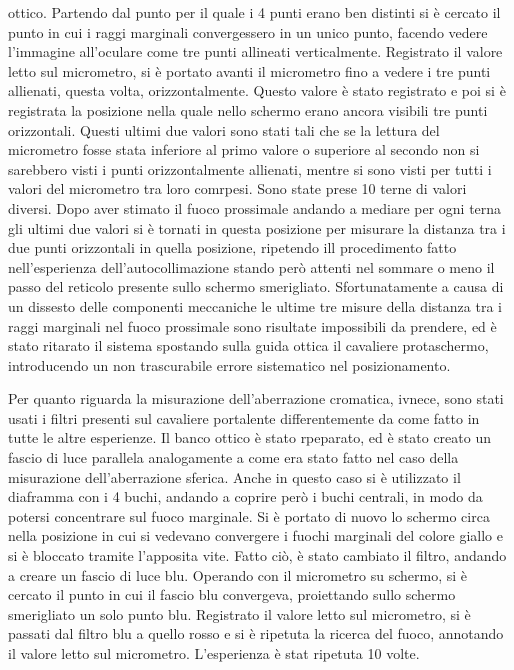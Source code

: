  ottico. Partendo dal punto per il quale i 4 punti erano ben distinti si è cercato il punto in cui i raggi marginali convergessero
 in un unico punto, facendo vedere l'immagine all'oculare come tre punti allineati verticalmente. Registrato il valore letto sul
 micrometro, si è portato avanti il micrometro fino a vedere i tre punti allienati, questa volta, orizzontalmente. Questo valore
 è stato registrato e poi si è registrata la posizione nella quale nello schermo erano ancora visibili tre punti orizzontali.
 Questi ultimi due valori sono stati tali che se la lettura del micrometro fosse stata inferiore al primo valore o superiore
 al secondo non si sarebbero visti i punti orizzontalmente allienati, mentre si sono visti per tutti i valori del micrometro tra
 loro comrpesi. Sono state prese 10 terne di valori diversi. Dopo aver stimato il fuoco prossimale andando a mediare per ogni terna
 gli ultimi due valori si è tornati in questa posizione per misurare la distanza tra i due punti orizzontali in quella posizione,
 ripetendo ill procedimento fatto nell'esperienza dell'autocollimazione stando però attenti nel sommare o meno il passo del reticolo
 presente sullo schermo smerigliato. Sfortunatamente a causa di un dissesto delle componenti meccaniche le ultime tre misure della
 distanza tra i raggi marginali nel fuoco prossimale sono risultate impossibili da prendere, ed è stato ritarato il sistema spostando
 sulla guida ottica il cavaliere protaschermo, introducendo un non trascurabile errore sistematico nel posizionamento.

 Per quanto riguarda la misurazione dell'aberrazione cromatica, ivnece, sono stati usati i filtri presenti sul cavaliere portalente
 differentemente da come fatto in tutte le altre esperienze. Il banco ottico è stato rpeparato, ed è stato creato un fascio di luce
 parallela analogamente a come era stato fatto nel caso della misurazione dell'aberrazione sferica. Anche in questo caso si è
 utilizzato il diaframma con i 4 buchi, andando a coprire però i buchi centrali, in modo da potersi concentrare sul fuoco
 marginale. Si è portato di nuovo lo schermo circa nella posizione in cui si vedevano convergere i fuochi marginali del colore giallo
 e si è bloccato tramite l'apposita vite. Fatto ciò, è stato cambiato il filtro, andando a creare un fascio di luce blu. Operando
 con il micrometro su schermo, si è cercato il punto in cui il fascio blu convergeva, proiettando sullo schermo smerigliato un
 solo punto blu. Registrato il valore letto sul micrometro, si è passati dal filtro blu a quello rosso e si è ripetuta la ricerca
 del fuoco, annotando il valore letto sul micrometro. L'esperienza è stat ripetuta 10 volte.
